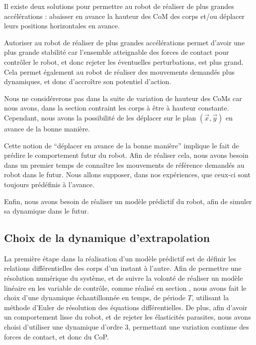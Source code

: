 			Il existe deux solutions pour permettre au robot de réaliser de plus grandes accélérations : 
			abaisser en avance la hauteur des CoM des corps et/ou déplacer leurs positions horizontales en avance. 
			
			Autoriser au robot de réaliser de plus grandes accélérations permet d'avoir une plus grande stabilité car l'ensemble atteignable des forces de contact pour contrôler le robot, et donc rejeter les éventuelles perturbations, est plus grand.
			Cela permet également au robot de réaliser des mouvements demandés plus dynamiques, et donc d’accroître son potentiel d'action.
			
			Nous ne considérerons pas dans la suite de variation de hauteur des CoMs car nous avons, dans la section  contraint les corps à être à hauteur constante.
			Cependant, nous avons la possibilité de les déplacer sur le plan $(\vec{x}, \vec{y})$ en avance de la bonne manière.
			
			Cette notion de ``déplacer en avance de la bonne manière'' implique le fait de prédire le comportement futur du robot.
			Afin de réaliser cela, nous avons besoin dans un premier temps de connaître les mouvements de référence demandés au robot dans le futur.
			Nous allons supposer, dans nos expériences, que ceux-ci sont toujours prédéfinis à l'avance.
			
			Enfin, nous avons besoin de réaliser un modèle prédictif du robot, afin de simuler sa dynamique dans le futur.

		\subsection{Choix de la dynamique d'extrapolation}

			La première étape dans la réalisation d'un modèle prédictif est de définir les relations différentielles des corps d'un instant à l'autre.
			Afin de permettre une résolution numérique du système, et de suivre la volonté de réaliser un modèle linéaire en les variable de contrôle, comme réalisé en section , 
			nous avons fait le choix d'une dynamique échantillonnée en temps, de période $T$, utilisant la méthode d'Euler de résolution des équations différentielles.
			De plus, afin d'avoir un comportement lisse du robot, et de rejeter les élasticités parasites, nous avons choisi d'utiliser une dynamique d'ordre 3, permettant une variation continue des forces de contact, et donc du CoP.
			

